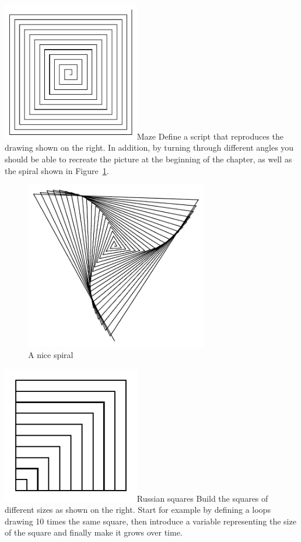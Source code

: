 \begin{exofigwithsizeandtitle}[0.4]{\includegraphics[width=6cm]{varLoopsMaze}}{Maze}\label{exo:maze}
Define a script that reproduces the drawing shown on the right. In addition, by turning through different angles you should be able to recreate the picture at the beginning of the chapter, as well as the spiral shown in  Figure~\ref{fig:spiral}.
\end{exofigwithsizeandtitle}

\begin{figure}
\begin{center}
\includegraphics[width=8cm]{varLoopsSpiral121}
\caption{A nice spiral\label{fig:spiral}}
\end{center}
\end{figure}

\begin{exofigwithsizeandtitle}[0.5]{\includegraphics[width=6cm]{Argmirescr}}{Russian squares}\label{exo:russianSquaressimple}
Build the squares of different sizes as shown on the right. Start for example by defining a loops drawing 10 times the same square, then introduce a variable representing the size of the square and finally make it grows over time.
\end{exofigwithsizeandtitle}


